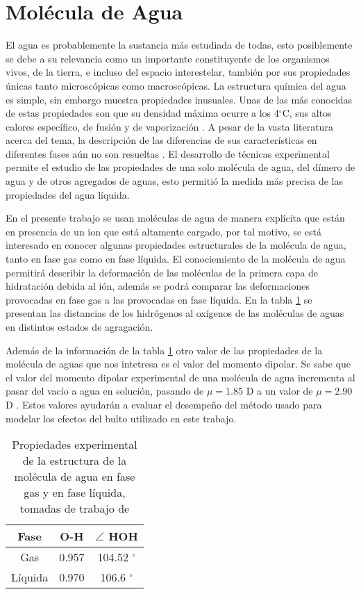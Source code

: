 \section{Mol\'ecula de Agua}
El agua es probablemente la sustancia m\'as estudiada de todas, esto
posiblemente se debe a su relevancia como un importante constituyente
de los organismos vivos, de la tierra, e incluso del espacio 
interestelar, tambi\'en por sus propiedades \'unicas tanto 
microsc\'opicas como macrosc\'opicas. La estructura qu\'imica del 
agua es simple, sin embargo muestra propiedades inusuales. Unas de 
las m\'as conocidas de estas propiedades son que su densidad m\'axima
ocurre a los 4$^{\circ}$C, sus altos calores espec\'ifico, de 
fusi\'on y de vaporizaci\'on \citep{Mori1997}. A pesar de la vasta 
literatura acerca del tema, la descripci\'on de las diferencias de 
sus caracter\'isticas en diferentes fases a\'un no son resueltas 
\citep{Sain2000}. El desarrollo de t\'ecnicas experimental permite el
estudio de las propiedades de una solo mol\'ecula de agua, del 
d\'imero de agua y de otros agregados de aguas, esto permiti\'o la
medida m\'as precisa de las propiedades del agua l\'iquida. 

En el presente trabajo se usan mol\'eculas de agua de manera 
expl\'icita que est\'an en presencia de un ion que est\'a altamente 
cargado, por tal motivo, se est\'a interesado en conocer algunas
propiedades estructurales de la mol\'ecula de agua, tanto en fase gas
como en fase l\'iquida. El conociemiento de la mol\'ecula de agua 
permitir\'a describir la deformaci\'on de las mol\'eculas de la 
primera capa de hidrataci\'on debida al i\'on, adem\'as se podr\'a 
comparar las deformaciones provocadas en fase gas a las provocadas en
fase l\'iquida. En la tabla \ref{tsf1} se presentan las distancias de
los hidr\'ogenos al ox\'igenos de las mol\'eculas de aguas en 
distintos estados de agragaci\'on. 

Adem\'as de la informaci\'on de la tabla \ref{tsf1} otro valor de las
propiedades de la mol\'ecula de aguas que nos intetresa es el valor 
del momento dipolar. Se sabe que el valor del momento dipolar 
experimental de una mol\'ecula de agua incrementa al pasar del 
vac\'io a agua en soluci\'on, pasando de $\mu=1.85$ D 
\citep{Clou1973} a un valor de $\mu=2.90$ D \citep{Bady2000}. Estos
valores ayudar\'an a evaluar el desempe\~no del m\'etodo usado para
modelar los efectos del bulto utilizado en este trabajo.

\begin{table}[h!]
\centering
\caption{\footnotesize Propiedades experimental de la estructura de 
la mol\'ecula de agua en fase gas y en fase l\'iquida, tomadas de 
trabajo de \cite{Mori1997}}
\begin{tabular}{c|cc}\hline\hline
Fase      & O-H & $\angle$ HOH \\ \hline
Gas       & 0.957 & 104.52 $^{\circ}$ \\ 
L\'iquida & 0.970 & 106.6  $^{\circ}$ \\ 
\hline \end{tabular}\label{tsf1}\end{table}




